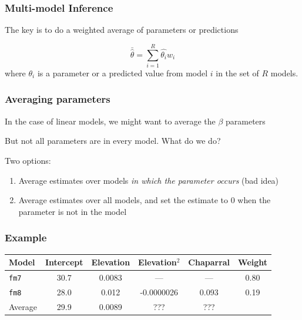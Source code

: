 \documentclass[color=usenames,dvipsnames]{beamer}\usepackage[]{graphicx}\usepackage[]{color}
\begin{document}
\begin{frame}
  \frametitle{Multi-model Inference}
  \large
  The key is to do a \alert{weighted average} of parameters or
    predictions \par
  \pause
  \[
    \bar{\hat{\theta}} = \sum_{i=1}^R \hat{\theta_i}w_i
  \]
  \pause
  where $\theta_i$ is a parameter or a predicted value from model $i$
    in the set of $R$ models.
\end{frame}



\begin{frame}
  \frametitle{Averaging parameters}
  \large
  {In the case of linear models, we might want to average the
    $\beta$ parameters \par}
  \pause
  \vspace{0.3cm}
  {But not all parameters are in every model. What do we do? \par}
  \pause
  \vspace{0.3cm}
  {Two options:}
  \begin{enumerate}[<+- | visible@+->][\bf \color{PineGreen} (1)]
    \item Average estimates over models {\it in which the parameter
        occurs} (bad idea)
    \item Average estimates over all models, and set the estimate to 0
      when the parameter is not in the model
  \end{enumerate}
\end{frame}


\begin{frame}
  \frametitle{Example}
  \begin{center}
    \begin{tabular}{lccccc}
      \hline
      Model & Intercept & Elevation & Elevation$^2$ & Chaparral & Weight \\
      \hline
      {\tt fm7} & 30.7 & 0.0083 & ---         & ---      & 0.80 \\
      {\tt fm8} & 28.0 & 0.012  & -0.0000026  & 0.093 & 0.19 \\
      \hline
      Average   & 29.9 & 0.0089 &  ???        & ???     &   \\
      \hline
    \end{tabular}
  \end{center}
\end{frame}
\end{document}
